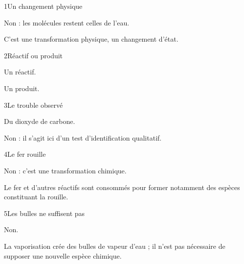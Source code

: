 \par\noindent\begin{minipage}{\linewidth}
\begin{corrige}{1}{Un changement physique}
\begin{questions}
\item Non : les molécules restent celles de l’eau.
\item C’est une transformation physique, un changement d’état.
\end{questions}
\end{corrige}
\end{minipage}
\par\noindent\begin{minipage}{\linewidth}
\begin{corrige}{2}{Réactif ou produit}
\begin{questions}
\item Un réactif.
\item Un produit.
\end{questions}
\end{corrige}
\end{minipage}
\par\noindent\begin{minipage}{\linewidth}
\begin{corrige}{3}{Le trouble observé}
\begin{questions}
\item Du dioxyde de carbone.
\item Non : il s’agit ici d’un test d’identification qualitatif.
\end{questions}
\end{corrige}
\end{minipage}
\par\noindent\begin{minipage}{\linewidth}
\begin{corrige}{4}{Le fer rouille}
\begin{questions}
\item Non : c’est une transformation chimique.
\item Le fer et d’autres réactifs sont consommés pour former notamment des espèces constituant la rouille.
\end{questions}
\end{corrige}
\end{minipage}
\par\noindent\begin{minipage}{\linewidth}
\begin{corrige}{5}{Les bulles ne suffisent pas}
\begin{questions}
\item Non.
\item La vaporisation crée des bulles de vapeur d’eau ; il n’est pas nécessaire de supposer une nouvelle espèce chimique.
\end{questions}
\end{corrige}
\end{minipage}
